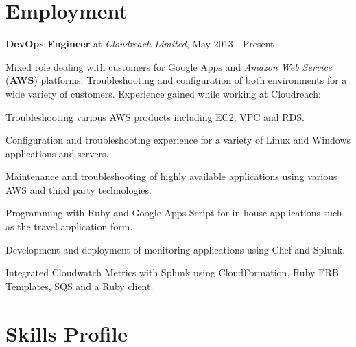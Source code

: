 \documentclass[11pt,a4paper]{article}
\renewenvironment{itemize}{
  \begin{list}{}{
    \setlength{\leftmargin}{1em}
    \setlength{\itemsep}{0.25em}
    \setlength{\parskip}{0pt}
    \setlength{\parsep}{0.25em}
    \renewcommand{\labelitemi}{$\bullet$}
  }
}{
  \end{list}
}
\begin{document}
\section*{Employment}

\begin{itemize}
    \item \textbf{DevOps Engineer} at \emph{Cloudreach Limited}, May 2013 - Present

    Mixed role dealing with customers for Google Apps and \emph{Amazon Web Service} (\textbf{AWS}) platforms. Troubleshooting and configuration of both environments for a wide variety of customers.
    Experience gained while working at Cloudreach:
    \begin{itemize}
      \item Troubleshooting various AWS products including EC2, VPC and RDS.
      \item Configuration and troubleshooting experience for a variety of Linux and Windows
        applications and servers.
      \item Maintenance and troubleshooting of highly available applications using various AWS and third party technologies.
      \item Programming with Ruby and Google Apps Script for in-house applications such as the travel application form.
      \item Development and deployment of monitoring applications using Chef and Splunk.
      \item Integrated Cloudwatch Metrics with Splunk using CloudFormation, Ruby ERB Templates, SQS and a Ruby client.
    \end{itemize}
\end{itemize}

\section*{Skills Profile}
\end{document}
